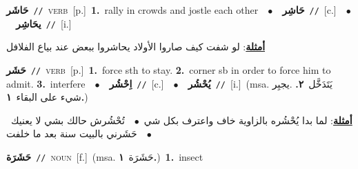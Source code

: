 \documentclass[10pt,a4paper,twoside]{article} %
\begin{document}
\begin{multicols}{2}
{\setlength\topsep{0pt}\textbf{\foreignlanguage{arabic}{حَاشَر}}\ {\color{gray}\texttt{//}\color{black}}\ \textsc{verb}\ [p.]\ \textbf{1.}~rally in crowds and jostle each other\ \ $\bullet$\ \ \setlength\topsep{0pt}\textbf{\foreignlanguage{arabic}{حَاشِر}}\ {\color{gray}\texttt{//}\color{black}}\ [c.]\ \ $\bullet$\ \ \setlength\topsep{0pt}\textbf{\foreignlanguage{arabic}{يحَاشِر}}\ {\color{gray}\texttt{//}\color{black}}\ [i.]\  \begin{flushright}\color{gray}\foreignlanguage{arabic}{\textbf{\underline{\foreignlanguage{arabic}{أمثلة}}}: لو شفت كيف صاروا الأولاد يحاشروا ببعض عند بياع الفلافل}\end{flushright}\color{black}} \vspace{2mm}

{\setlength\topsep{0pt}\textbf{\foreignlanguage{arabic}{حَشَر}}\ {\color{gray}\texttt{//}\color{black}}\ \textsc{verb}\ [p.]\ \textbf{1.}~force sth to stay.  \textbf{2.}~corner sb in order to force him to admit.  \textbf{3.}~interfere\ \ $\bullet$\ \ \setlength\topsep{0pt}\textbf{\foreignlanguage{arabic}{اِحْشُر}}\ {\color{gray}\texttt{//}\color{black}}\ [c.]\ \ $\bullet$\ \ \setlength\topsep{0pt}\textbf{\foreignlanguage{arabic}{يُحْشُر}}\ {\color{gray}\texttt{//}\color{black}}\ [i.]\ \color{gray}(msa. \foreignlanguage{arabic}{يَتَدَخَّل}~\foreignlanguage{arabic}{\textbf{٢.}}  .\foreignlanguage{arabic}{يجبِر شيء على البقاء}~\foreignlanguage{arabic}{\textbf{١.}})\color{black}\  \begin{flushright}\color{gray}\foreignlanguage{arabic}{\textbf{\underline{\foreignlanguage{arabic}{أمثلة}}}: لما بدا يُحْشُره بالزاوية خاف واعترف بكل شي\ $\bullet$\ \  تُحْشُرش حالك بشي لا يعنيك\ $\bullet$\ \  حَشَرني بالبيت  سنة بعد ما خلفت}\end{flushright}\color{black}} \vspace{2mm}

{\setlength\topsep{0pt}\textbf{\foreignlanguage{arabic}{حَشَرَة}}\ {\color{gray}\texttt{//}\color{black}}\ \textsc{noun}\ [f.]\ \color{gray}(msa. \foreignlanguage{arabic}{حَشَرَة}~\foreignlanguage{arabic}{\textbf{١.}})\color{black}\ \textbf{1.}~insect\ } \vspace{2mm}


\end{multicols}
\end{document}
